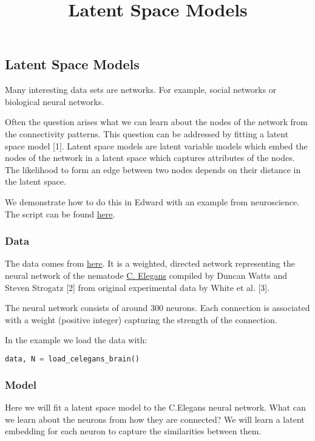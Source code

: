 \title{Latent Space Models}

\subsection{Latent Space Models}

Many interesting data sets are networks. For example, social networks or biological neural networks.

Often the question arises what we can learn about the nodes of the network from the connectivity patterns. This question can be addressed by fitting a latent space model [1].
Latent space models are latent variable models which embed the nodes of the network in a latent space which captures attributes of the nodes. The likelihood to form an edge between two nodes depends on their distance in the latent space.

We demonstrate how to do this in Edward with an example from neuroscience. The script can be found \href{https://github.com/blei-lab/edward/blob/master/examples/latent_space_model.py}{here}.

\subsubsection{Data}

The data comes from \href{http://www-personal.umich.edu/~mejn/netdata/}{here}.
It is a weighted, directed network representing the neural network of the nematode \href{https://en.wikipedia.org/wiki/Caenorhabditis_elegans}{C. Elegans} compiled by Duncan Watts and Steven Strogatz [2] from original experimental data by White et al. [3]. 

The neural network consists of around $300$ neurons. Each connection is associated with a weight (positive integer) capturing the strength of the connection.

In the example we load the data with:
\begin{lstlisting}[language=Python]
data, N = load_celegans_brain()
\end{lstlisting}

\subsubsection{Model}

Here we will fit a latent space model to the C.Elegans neural network. What can we learn about the neurons from how they are connected? We will learn a latent embedding for each neuron to capture the similarities between them.

